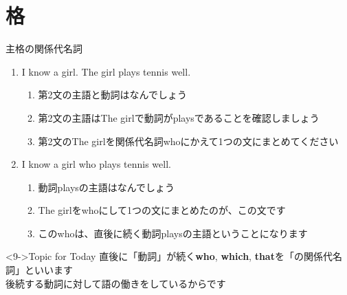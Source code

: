 \documentclass[aspectratio=169,xcolor={dvipsnames,table}]{beamer}
\begin{document}
\section{格}
\begin{frame}[plain,t]{主格の関係代名詞}

\begin{enumerate}
 \item<1-> I know a girl. The girl plays tennis well.
       \begin{enumerate}
	\item<2-> 第2文の主語と動詞はなんでしょう
	\item<3-> 第2文の主語はThe girlで動詞がplaysであることを確認しましょう
	\item<4-> 第2文のThe girlを関係代名詞whoにかえて1つの文にまとめてください
       \end{enumerate}
 \item<5-> I know a girl who plays tennis well.
       \begin{enumerate}
	\item<6-> 動詞playsの主語はなんでしょう
	\item<7-> The girlをwhoにして1つの文にまとめたのが、この文です
	\item<8-> このwhoは、直後に続く動詞playsの主語ということになります
       \end{enumerate}
\end{enumerate}


\vspace{25pt}


\begin{block}<9->{Topic for Today}
\small
 直後に「動詞」が続く\textbf{who}, \textbf{which}, \textbf{that}を「の関係代名詞」といいます\\
\hfill{\scriptsize 後続する動詞に対して語の働きをしているからです}\raisebox{0pt}{\dbend}\\
\mbox{}
     \end{block}

\end{frame}
\end{document}
